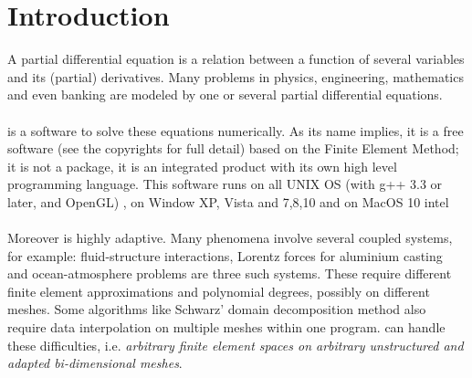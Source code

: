 \documentclass[a4paper,twoside,12pt]{book}
\begin{document}
\section{Introduction}%
A partial differential equation is a relation between a function
of several variables and its (partial) derivatives.
 Many problems in physics, engineering, mathematics and even banking
are modeled by one or several partial differential equations.
\\\\
\freefempp is a software to solve these equations numerically. As
its name implies, it is a free software (see the copyrights for full detail)
based  on the Finite Element Method; it is not a package, it is an integrated product with its own
high level programming language. This software runs on all UNIX
OS (with g++ 3.3 or later, and OpenGL) , on Window  XP, Vista and 7,8,10 and on
MacOS 10 intel \\\\
Moreover \freefempp is highly adaptive.  Many phenomena involve
several  coupled systems, for example: fluid-structure interactions,
Lorentz forces for aluminium casting and ocean-atmosphere problems are
three such systems. These require different finite element approximations and polynomial
degrees, possibly on different meshes. Some algorithms like
Schwarz' domain decomposition method also require data interpolation
on multiple meshes within one program. \freefempp can handle these
difficulties, i.e. {\it arbitrary finite element spaces on arbitrary
unstructured and adapted bi-dimensional meshes}.  \\\\
\end{document}
